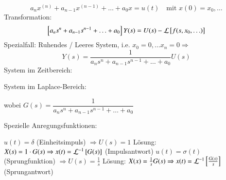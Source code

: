 \begin{equation*}
    a_nx^{(n)} + a_{n-1}x^{(n-1)}+\ldots+a_0x = u(t) 
    \hspace{1em} \text{mit } x(0)=x_0,\ldots
\end{equation*}
Transformation:
\begin{equation*}
    \left[ a_ns^n+a_{n-1}s^{n-1}+\ldots+a_0 \right]Y(s) = U(s) 
        - \mathcal{L}\left[ f(s,x_0,\ldots) \right]
\end{equation*}
Spezialfall: Ruhendes / Leeres System, i.e. $x_0=0,\ldots x_n=0\Rightarrow$
\begin{equation*}
    Y(s) = \frac{1}{a_ns^n+a_{n-1}s^{n-1}+\ldots+a_0}U(s) 
\end{equation*}
System im Zeitbereich:
\begin{center}
\end{center}
System im Laplace-Bereich:
\begin{center}
\end{center}
wobei $G(s) = \dfrac{1}{a_ns^n+a_{n-1}s^{n-1}+\ldots+a_0}$

Spezielle Anregungsfunktionen:
\begin{outline}
    \1 $u(t) = \delta$ (Einheitsimpuls) $\Rightarrow U(s)=1$
    \2[] Lösung: $X(s) = 1\cdot G(s)\Rightarrow x(t)=\mathcal{L}^{-1}\left[ G(s) \right]$
        (Impulsantwort)
    \1 $u(t) = \sigma(t)$ (Sprungfunktion) $\Rightarrow U(s) = \frac{1}{s}$
    \2[] Lösung: $X(x) = \frac{1}{s} G(s)\Rightarrow x(t)=\mathcal{L}^{-1}\left[
        \frac{G(s)}{s} \right]$ (Sprungantwort)
\end{outline}

